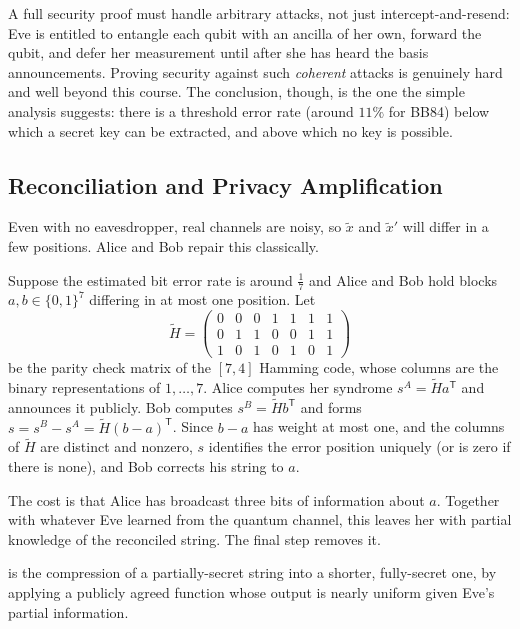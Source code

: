 \documentclass[a4paper]{scrartcl}
\begin{document}
\begin{remark}
	A full security proof must handle arbitrary attacks, not just intercept-and-resend: Eve is entitled to entangle each qubit with an ancilla of her own, forward the qubit, and defer her measurement until after she has heard the basis announcements. Proving security against such \emph{coherent} attacks is genuinely hard and well beyond this course. The conclusion, though, is the one the simple analysis suggests: there is a threshold error rate (around $11\%$ for BB84) below which a secret key can be extracted, and above which no key is possible.
\end{remark}

\subsection{Reconciliation and Privacy Amplification}

Even with no eavesdropper, real channels are noisy, so $\widetilde x$ and $\widetilde x'$ will differ in a few positions. Alice and Bob repair this classically.

\begin{example}
	Suppose the estimated bit error rate is around $\tfrac17$ and Alice and Bob hold blocks $a, b \in \{0,1\}^7$ differing in at most one position. Let
	$$\widetilde H = \begin{pmatrix} 0&0&0&1&1&1&1\\0&1&1&0&0&1&1\\1&0&1&0&1&0&1\end{pmatrix}$$
	be the parity check matrix of the $[7,4]$ Hamming code, whose columns are the binary representations of $1,\dots,7$. Alice computes her syndrome $s^A = \widetilde H a^{\mathsf T}$ and announces it publicly. Bob computes $s^B = \widetilde Hb^{\mathsf T}$ and forms $s = s^B - s^A = \widetilde H(b-a)^{\mathsf T}$. Since $b - a$ has weight at most one, and the columns of $\widetilde H$ are distinct and nonzero, $s$ identifies the error position uniquely (or is zero if there is none), and Bob corrects his string to $a$.
\end{example}

The cost is that Alice has broadcast three bits of information about $a$. Together with whatever Eve learned from the quantum channel, this leaves her with partial knowledge of the reconciled string. The final step removes it.

\begin{definition}
	 is the compression of a partially-secret string into a shorter, fully-secret one, by applying a publicly agreed function whose output is nearly uniform given Eve's partial information.
\end{definition}
\end{document}
